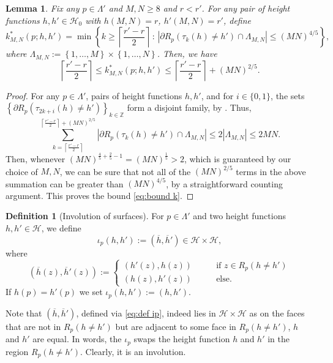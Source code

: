 \documentclass[reqno,11pt]{amsart}
\numberwithin{equation}{section}
\newtheorem{lemma}[proposition]{Lemma}
\theoremstyle{definition}
\newtheorem{definition}[proposition]{Definition}
\begin{document}
\begin{lemma} \label{lem:bound k}
    Fix any $p\in \Lambda'$ and $M,N \ge 8$ and $r < r'$. For any pair of height functions $h,h' \in \mathscr{H}_0^{}$ with $h(M,N)=r$, $h'(M,N)=r'$, define
    \begin{equation} \label{eq:def k}
        k^*_{M,N}(p;h,h') = \min \left\{ k\ge \left\lceil \frac{r'-r}{2} \right\rceil \,: \, \left| \partial R_{p}(\tau_k(h)\neq h') \cap \Lambda_{M,N} \right| \le (MN)^{4/5} \right\},
    \end{equation}
    where $\Lambda_{M,N} := \left\{ 1,\dots, M \right\} \times \left\{ 1,\dots, N  \right\}$.
    Then, we have
    \begin{equation} \label{eq:bound k}
        \left\lceil \frac{r'-r}{2} \right\rceil \le k^*_{M,N}(p;h,h') \le \left\lceil \frac{r'-r}{2} \right\rceil + (MN)^{2/5}.
    \end{equation}
\end{lemma}
\begin{proof}
    For any $p\in \Lambda'$, pairs of height functions $h,h'$, and for $i\in \{0,1\}$, the sets $\left\{ \partial R_p(\tau_{2k+i}(h) \neq h') \right\}_{k \in \mathbb{Z}}$
    form a disjoint family, by . Thus,
   \begin{equation*}
       \sum_{k=\left\lceil \frac{r'-r}{2} \right\rceil}^{\left\lceil \frac{r'-r}{2} \right\rceil + (MN)^{2/5}} \left| \partial R_p(\tau_{k}(h)\neq h') \cap \Lambda_{M,N} \right| \le 2 |\Lambda_{M,N}| \le 2MN.
   \end{equation*}
   Then, whenever $(MN)^{\frac{4}{5}+\frac{2}{5}-1}=(MN)^{\frac{1}{5}}>2$, which is guaranteed by our choice of $M,N$, we can be sure that not all of the $(MN)^{2/5}$ terms in the above summation can be greater than $(MN)^{4/5}$, by a straightforward counting argument. This proves the bound \eqref{eq:bound k}.
\end{proof}

\begin{definition}[Involution of surfaces] \label{iotamap}
    For $p\in \Lambda'$ and two height functions $h,h' \in \mathscr{H}$, we define 
    \begin{equation*}
        \iota_p(h,h'):= (\overline{h},\overline{h}') \in \mathscr{H} \times \mathscr{H},
    \end{equation*}
    where
    \begin{equation} \label{eq:def ip}
        (\overline{h}(z),\overline{h}'(z)) := 
        \begin{cases}
            (h'(z),h(z)) \qquad & \text{if } z \in R_p(h \neq h')
            \\
            (h(z),h'(z)) \qquad & \text{else}.
        \end{cases}
    \end{equation}
    If $h(p)=h'(p)$ we set $\iota_p (h,h'):=(h,h')$.
\end{definition}
Note that $(\overline{h},\overline{h}')$, defined via \eqref{eq:def ip}, indeed lies in $\mathscr{H}\times \mathscr{H}$ as on the faces that are not in $R_p(h\neq h')$ but are adjacent to some face in $R_p(h \neq h')$, $h$ and $h'$ are equal. In words, the $\iota_p$ swaps the height function $h$ and $h'$ in the region $R_p(h\neq h')$. Clearly, it is an involution.
\end{document}
